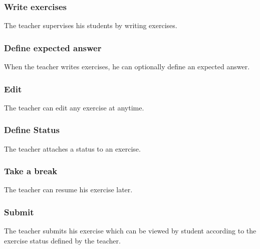 		\subsubsection{Write exercises}
			The teacher supervises his students by writing exercises.
		\subsubsection{Define expected answer}
			When the teacher writes exercises, he can optionally define an expected answer.
		\subsubsection{Edit}
			The teacher can edit any exercise at anytime.
		\subsubsection{Define Status}
			The teacher attaches a status to an exercise.
		\subsubsection{Take a break}
			The teacher can resume his exercise later.
		\subsubsection{Submit}
			The teacher submits his exercise which can be viewed by student according to the exercise status defined by the teacher.
	\newpage
